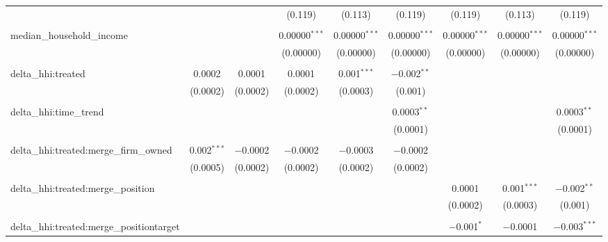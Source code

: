 \begin{table}[H]
{\begin{tabular}{@{\extracolsep{5pt}}lcccccccc}
   &  &  & (0.119) & (0.113) & (0.119) & (0.119) & (0.113) & (0.119) \\  

   & & & & & & & & \\  

  median\_household\_income &  &  & 0.00000$^{***}$ & 0.00000$^{***}$ & 0.00000$^{***}$ & 0.00000$^{***}$ & 0.00000$^{***}$ & 0.00000$^{***}$ \\  

   &  &  & (0.00000) & (0.00000) & (0.00000) & (0.00000) & (0.00000) & (0.00000) \\  

   & & & & & & & & \\  

  delta\_hhi:treated & 0.0002 & 0.0001 & 0.0001 & 0.001$^{***}$ & $-$0.002$^{**}$ &  &  &  \\  

   & (0.0002) & (0.0002) & (0.0002) & (0.0003) & (0.001) &  &  &  \\  

   & & & & & & & & \\  

  delta\_hhi:time\_trend &  &  &  &  & 0.0003$^{**}$ &  &  & 0.0003$^{**}$ \\  

   &  &  &  &  & (0.0001) &  &  & (0.0001) \\  

   & & & & & & & & \\  

  delta\_hhi:treated:merge\_firm\_owned & 0.002$^{***}$ & $-$0.0002 & $-$0.0002 & $-$0.0003 & $-$0.0002 &  &  &  \\  

   & (0.0005) & (0.0002) & (0.0002) & (0.0002) & (0.0002) &  &  &  \\  

   & & & & & & & & \\  

  delta\_hhi:treated:merge\_position &  &  &  &  &  & 0.0001 & 0.001$^{***}$ & $-$0.002$^{**}$ \\  

   &  &  &  &  &  & (0.0002) & (0.0003) & (0.001) \\  

   & & & & & & & & \\  

  delta\_hhi:treated:merge\_positiontarget &  &  &  &  &  & $-$0.001$^{*}$ & $-$0.0001 & $-$0.003$^{***}$ \\  


\end{tabular}}
\end{table}
